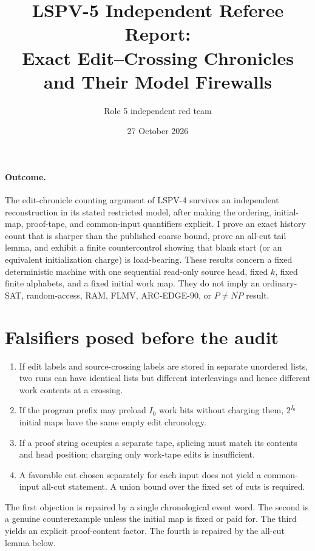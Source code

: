 \documentclass[11pt]{article}
\title{LSPV-5 Independent Referee Report:\\Exact Edit--Crossing Chronicles and Their Model Firewalls}
\author{Role 5 independent red team}
\date{27 October 2026}
\begin{document}
\maketitle

\paragraph{Outcome.}
The edit-chronicle counting argument of LSPV-4 survives an independent reconstruction in its stated restricted model, after making the ordering, initial-map, proof-tape, and common-input quantifiers explicit.  I prove an exact history count that is sharper than the published coarse bound, prove an all-cut tail lemma, and exhibit a finite countercontrol showing that blank start (or an equivalent initialization charge) is load-bearing.  These results concern a fixed deterministic machine with one sequential read-only source head, fixed $k$, fixed finite alphabets, and a fixed initial work map.  They do not imply an ordinary-SAT, random-access, RAM, FLMV, ARC-EDGE-90, or $P\ne NP$ result.

\section{Falsifiers posed before the audit}

\begin{enumerate}
\item If edit labels and source-crossing labels are stored in separate unordered lists, two runs can have identical lists but different interleavings and hence different work contents at a crossing.
\item If the program prefix may preload $I_0$ work bits without charging them, $2^{I_0}$ initial maps have the same empty edit chronology.
\item If a proof string occupies a separate tape, splicing must match its contents and head position; charging only work-tape edits is insufficient.
\item A favorable cut chosen separately for each input does not yield a common-input all-cut statement.  A union bound over the fixed set of cuts is required.
\end{enumerate}

The first objection is repaired by a single chronological event word.  The second is a genuine counterexample unless the initial map is fixed or paid for.  The third yields an explicit proof-content factor.  The fourth is repaired by the all-cut lemma below.
\end{document}
